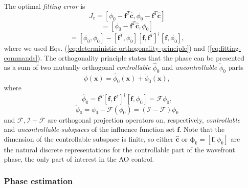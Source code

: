 The optimal \emph{fitting error} is 
\begin{equation} \label{eq:fitting-error}
	J_{c} = [\phi_{0} - \bm{f}^{T} \hat{\bm{c}},\phi_{0} -
	         \bm{f}^{T} \hat{\bm{c}}]
\end{equation}
$$
  = [\phi_{0} - \bm{f}^{T} \hat{\bm{c}},\phi_{0}]
$$
$$
  = [\phi_{0},\phi_{0}] -
    [\bm{f}^{T},\phi_{0}] [\bm{f},\bm{f}^{T}]^{\dagger} [\bm{f},\phi_{0}],
$$
where we used Eqs. (\ref{eq:deterministic-orthogonality-principle}) and
(\ref{eq:fitting-commands}). The orthogonality principle states that the phase
can be presented as a sum of two mutually orthogonal \emph{controllable}
$\hat{\phi}_{0}$ and
\emph{uncontrollable} $\check{\phi}_{0}$ parts 
\begin{equation} \label{eq:controllable-uncontrollable}
	\phi (\bm{x}) = \hat{\phi}_{0} (\bm{x}) + \check{\phi}_{0} (\bm{x}),
\end{equation}
where
\begin{equation} \label{eq:controllable-projection}
	\hat{\phi}_{0} = \bm{f}^{T} [\bm{f},\bm{f}^{T}]^{\dagger} [\bm{f},\phi_{0}] =
	\mathcal{F} \phi_{0},
\end{equation}
\begin{equation} \label{eq:uncontrollable-projection}
	\check{\phi}_{0} = \phi_{0} - \mathcal{F} (\phi_{0}) =
	(\mathcal{I - F})\phi_{0}
\end{equation}
and $\mathcal{F},\mathcal{I - F}$ are orthogonal projection operators on,
respectively, \emph{controllable} and \emph{uncontrollable subspaces} of the
influence function set $\bm{f}$. 
 Note that the dimension of the controllable
subspace is finite, so either $\hat{\bm{c}}$ or $\bm{\phi}_{0} =
[\bm{f},\phi_{0}]$
are the natural discrete representations for the controllable part of the
wavefront phase, the only part of interest in the AO control.

\subsubsection{Phase estimation}

